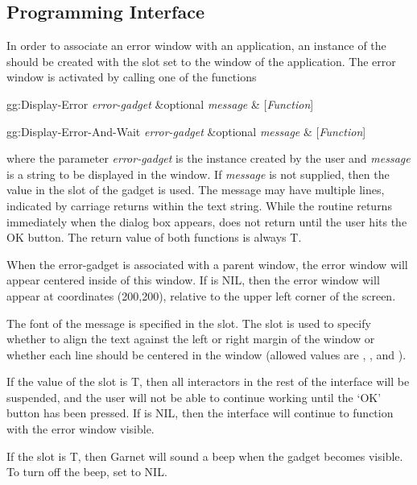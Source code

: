 \subsection{Programming Interface}

In order to associate an error window with an application, an instance
of the  should be created with the
 slot set to the window of the application.  The
error window is activated by calling one of the functions
 
\begin{programexample}
gg:Display-Error {\it error-gadget} \&optional {\it message} & [{\it Function}]

gg:Display-Error-And-Wait {\it error-gadget} \&optional {\it message} & [{\it Function}]
\end{programexample}
where the parameter {\it error-gadget} is the
instance created by the user and {\it message} is a string to be
displayed in the window.  If {\it message} is not supplied, then the value
in the  slot of the gadget is used.  The message may have multiple
lines, indicated by carriage returns within the text string.  While the
 routine returns immediately when the dialog box
appears,  does not return until the user
hits the OK button.  The return value of both functions is always T.

When the error-gadget is associated with a parent window, the
error window will appear centered inside of this window.  If
 is NIL, then the error window will appear at
coordinates (200,200), relative to the upper left corner of the
screen.

The font of the message is specified in the  slot.  The
 slot is used to specify whether to align the text
against the left or right margin of the window or whether each line
should be centered in the window (allowed values are ,
, and ).

If the value of the  slot is T, then all interactors in
the rest of the interface will be suspended, and the user will not be
able to continue working until the `OK' button has been pressed.  If
 is NIL, then the interface will continue to function
with the error window visible.

If the  slot is T, then Garnet will sound a beep when the
gadget becomes visible.  To turn off the beep, set  to NIL.


